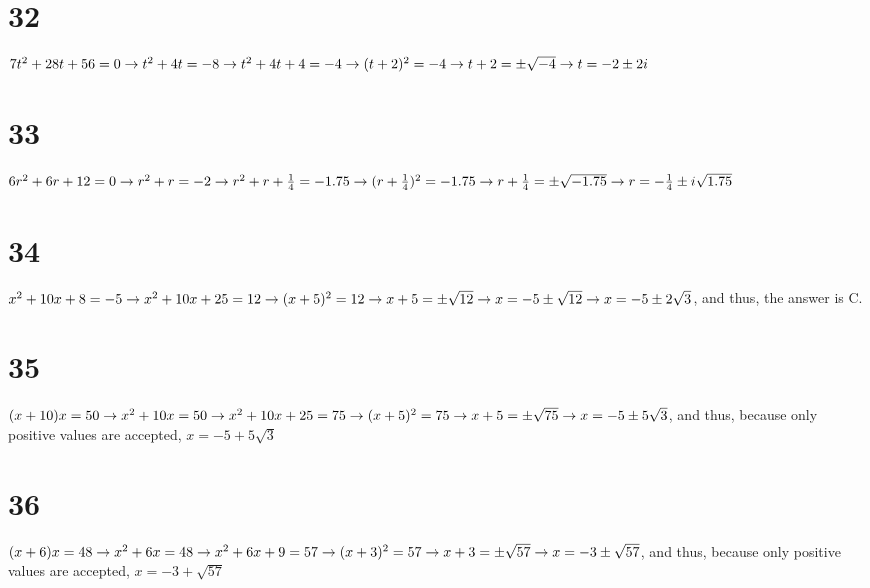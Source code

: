 \documentclass{article}
\theoremstyle{definition}
\begin{document}
\section*{32}
$7t^2+28t+56=0\newline\rightarrow t^2+4t=-8\newline\rightarrow t^2+4t+4=-4\newline\rightarrow (t+2)^2=-4\newline\rightarrow t+2=\pm\sqrt{-4}
\newline\rightarrow t=-2\pm 2i$

\section*{33}
$6r^2+6r+12=0\newline\rightarrow r^2+r=-2\newline\rightarrow r^2+r+\frac{1}{4}=-1.75\newline\rightarrow (r+\frac{1}{4})^2=-1.75\newline\rightarrow 
r+\frac{1}{4}=\pm\sqrt{-1.75}\newline\rightarrow r=-\frac{1}{4}\pm i\sqrt{1.75}$

\section*{34}
$x^2+10x+8=-5\newline\rightarrow x^2+10x+25=12\newline\rightarrow (x+5)^2=12\newline\rightarrow x+5=\pm\sqrt{12}\newline\rightarrow x=-5\pm\sqrt{12}\newline
\rightarrow x=-5\pm 2\sqrt{3}$, 
and thus, the answer is C.

\section*{35}
$(x+10)x=50\newline\rightarrow x^2+10x=50\newline\rightarrow x^2+10x+25=75\newline\rightarrow (x+5)^2=75\newline\rightarrow x+5=\pm\sqrt{75}\newline
\rightarrow x=-5\pm 5\sqrt{3}$, and thus, because only positive values are accepted, $x=-5+5\sqrt{3}$

\section*{36}
$(x+6)x=48\newline\rightarrow x^2+6x=48\newline\rightarrow x^2+6x+9=57\newline\rightarrow (x+3)^2=57\newline\rightarrow x+3=\pm\sqrt{57}\newline\rightarrow 
x=-3\pm\sqrt{57}$, and thus, because only positive values are accepted, $x=-3+\sqrt{57}$
\end{document}
